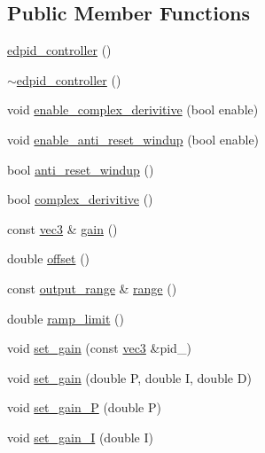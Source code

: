 \subsection*{Public Member Functions}
\begin{DoxyCompactItemize}
\item 
\hyperlink{classedpid__controller_a6008f5babbd8bc9141e5abba929ef790}{edpid\-\_\-controller} ()
\item 
\hyperlink{classedpid__controller_a683ec5f02e55d19b7ec2675fe0190f71}{$\sim$edpid\-\_\-controller} ()
\item 
void \hyperlink{classedpid__controller_a3f0c19167813e4030edec7f42a0d0661}{enable\-\_\-complex\-\_\-derivitive} (bool enable)
\item 
void \hyperlink{classedpid__controller_aa04a42b0f58b8eb752a463cb56afab6f}{enable\-\_\-anti\-\_\-reset\-\_\-windup} (bool enable)
\item 
bool \hyperlink{classedpid__controller_a88f516cfe3bb8d3e95f2d5dfd923d646}{anti\-\_\-reset\-\_\-windup} ()
\item 
bool \hyperlink{classedpid__controller_a9946eac8a4f3181706d54ba8bd96026f}{complex\-\_\-derivitive} ()
\item 
const \hyperlink{nsmath_8h_a14bb8a4a0fefc0be4fae32fc59a07362}{vec3} \& \hyperlink{classedpid__controller_a4a8906107d15d7a917444ee98c703f7d}{gain} ()
\item 
double \hyperlink{classedpid__controller_a2e7e231001cd92137021664c43d1cc0b}{offset} ()
\item 
const \hyperlink{structedpid__controller_1_1output__range}{output\-\_\-range} \& \hyperlink{classedpid__controller_a64befb22b629646521abb29d25c8f14e}{range} ()
\item 
double \hyperlink{classedpid__controller_adb51025b2e94dbd63aa1841e3712100a}{ramp\-\_\-limit} ()
\item 
void \hyperlink{classedpid__controller_a4ec73738276f6cc8fe6df6a82b602f57}{set\-\_\-gain} (const \hyperlink{nsmath_8h_a14bb8a4a0fefc0be4fae32fc59a07362}{vec3} \&pid\-\_\-)
\item 
void \hyperlink{classedpid__controller_a3dbbe642abf4db2cec4c6489896e05bd}{set\-\_\-gain} (double P, double I, double D)
\item 
void \hyperlink{classedpid__controller_ae730045cd6f055530783cf959e97f391}{set\-\_\-gain\-\_\-\-P} (double P)
\item 
void \hyperlink{classedpid__controller_a633260c32c9c7ae2b3c253f56bce57e7}{set\-\_\-gain\-\_\-\-I} (double I)
\item 

\end{DoxyCompactItemize}
